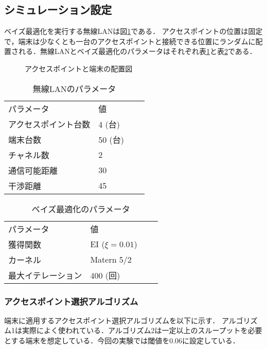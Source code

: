 \documentclass[a4paper,11pt]{jarticle}
\begin{document}
\subsection{シミュレーション設定}
ベイズ最適化を実行する無線LANは図\ref{position}である．
アクセスポイントの位置は固定で，端末は少なくとも一台のアクセスポイントと接続できる位置にランダムに配置される．無線LANとベイズ最適化のパラメータはそれぞれ表\ref{network_parameter}と表\ref{bayes_parameter}である．

\begin{figure}[t]
  \centering
  
  \caption{アクセスポイントと端末の配置図}
  \label{position}
\end{figure}

\begin{table}[H]
\centering
\caption{無線LANのパラメータ}
\begin{tabular}{l|lll}
パラメータ & 値 &  &  \\ \cline{1-2}
アクセスポイント台数 & 4 (台)  &  &  \\
端末台数 & 50 (台) &  &  \\
チャネル数 & 2 &  &  \\
通信可能距離  & 30 &  &  \\
干渉距離 & 45 &  &  \\
\end{tabular}
\label{network_parameter}
\end{table}

\begin{table}[H]
\centering
\caption{ベイズ最適化のパラメータ}
\begin{tabular}{l|lll}
パラメータ & 値 &  &  \\ \cline{1-2}
獲得関数 & EI ($\xi=0.01$)&  &  \\
カーネル & Matern 5/2 &  &  \\
最大イテレーション & 400 (回) &  & \\
\end{tabular}
\label{bayes_parameter}
\end{table}

\subsubsection{アクセスポイント選択アルゴリズム}
端末に適用するアクセスポイント選択アルゴリズムを以下に示す．
アルゴリズム1は実際によく使われている．アルゴリズム2は一定以上のスループットを必要とする端末を想定している．今回の実験では閾値を0.06に設定している．
\end{document}
